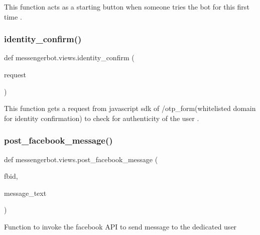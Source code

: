 \begin{DoxyVerb}This function acts as a starting button when someone tries the bot for this first time .
\end{DoxyVerb}
 \mbox{\label{namespacemessengerbot_1_1views_a0422c7b7111b5e4de6bc606e67c554ef}} 
\subsubsection{\texorpdfstring{identity\+\_\+confirm()}{identity\_confirm()}}
{\footnotesize\ttfamily def messengerbot.\+views.\+identity\+\_\+confirm (\begin{DoxyParamCaption}\item[{}]{request }\end{DoxyParamCaption})}

\begin{DoxyVerb}This function gets a request from javascript sdk of /otp_form(whitelisted domain for identity confirmation) to check for authenticity of the user .  
\end{DoxyVerb}
 \mbox{\label{namespacemessengerbot_1_1views_a1640e1dc00146c9ca843d7a746cf122d}} 
\subsubsection{\texorpdfstring{post\+\_\+facebook\+\_\+message()}{post\_facebook\_message()}}
{\footnotesize\ttfamily def messengerbot.\+views.\+post\+\_\+facebook\+\_\+message (\begin{DoxyParamCaption}\item[{}]{fbid,  }\item[{}]{message\+\_\+text }\end{DoxyParamCaption})}

\begin{DoxyVerb}Function to invoke the facebook API to send message to the dedicated user\end{DoxyVerb}
 